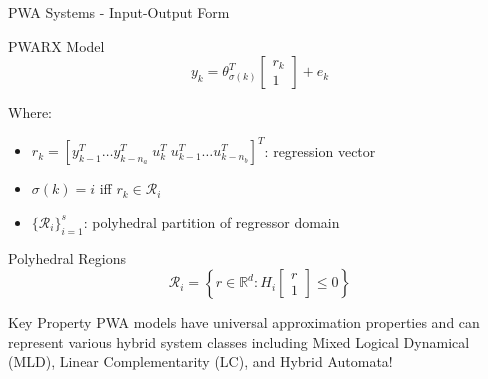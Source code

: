 \documentclass[aspectratio=169]{beamer}
\begin{document}
\begin{frame}{PWA Systems - Input-Output Form}
\begin{block}{PWARX Model}
$$y_k = \theta_{\sigma(k)}^T \begin{bmatrix} r_k \\ 1 \end{bmatrix} + e_k$$
\end{block}

Where:
\begin{itemize}
\item $r_k = [y_{k-1}^T \ldots y_{k-n_a}^T \; u_k^T \; u_{k-1}^T \ldots u_{k-n_b}^T]^T$: regression vector
\item $\sigma(k) = i$ iff $r_k \in \mathcal{R}_i$
\item $\{\mathcal{R}_i\}_{i=1}^s$: polyhedral partition of regressor domain
\end{itemize}

\begin{block}{Polyhedral Regions}
$$\mathcal{R}_i = \left\{r \in \mathbb{R}^d : H_i \begin{bmatrix} r \\ 1 \end{bmatrix} \leq 0\right\}$$
\end{block}

\begin{alertblock}{Key Property}
PWA models have universal approximation properties and can represent various hybrid system classes including Mixed Logical Dynamical (MLD), Linear Complementarity (LC), and Hybrid Automata!
\end{alertblock}
\end{frame}
\end{document}
